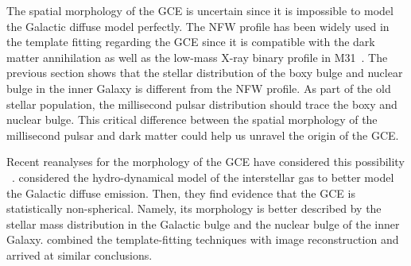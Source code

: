 \documentclass[doublespace,nopageskip]{VTthesis} %
\newcommand{\mrm}[1]{\mathrm{#1}}
\begin{document}
The spatial morphology of the GCE is uncertain since it is impossible to model the Galactic diffuse model perfectly. The NFW profile has been widely used in the template fitting regarding the GCE since it is compatible with the dark matter annihilation as well as the low-mass X-ray binary profile in M31~\cite{2012PhRvD..86h3511A}. The previous section shows that the stellar distribution of the boxy bulge and nuclear bulge in the inner Galaxy is different from the NFW profile. As part of the old stellar population, the millisecond pulsar distribution should trace the boxy and nuclear bulge. This critical difference between the spatial morphology of the millisecond pulsar and dark matter could help us unravel the origin of the GCE.

Recent reanalyses for the morphology of the GCE have considered this possibility ~\citep{2018NatAs...2..387M,2018NatAs...2..819B,2019JCAP...09..042M, 2020PhRvD.102d3012A}. \citet{2018NatAs...2..387M} considered the hydro-dynamical model of the interstellar gas to better model the Galactic diffuse emission. Then, they find evidence that the GCE is statistically non-spherical. Namely, its morphology is better described by the stellar mass distribution in the Galactic bulge and the nuclear bulge of the inner Galaxy. \citet{2018NatAs...2..819B} combined the template-fitting techniques with image reconstruction and arrived at similar conclusions.




\end{document}
